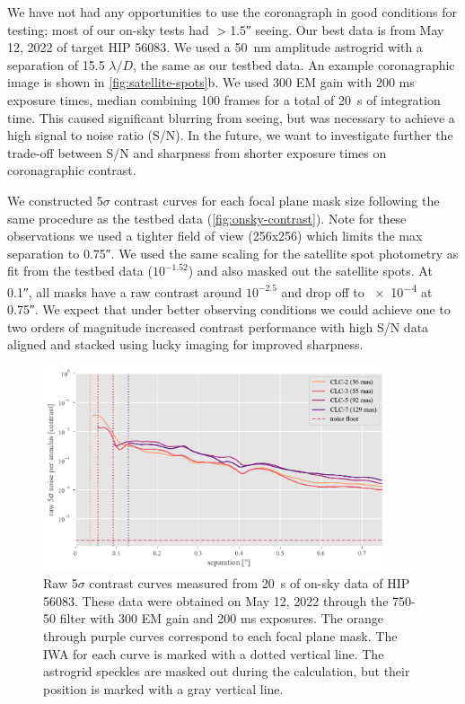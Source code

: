 \documentclass[]{spie}  %
\begin{document}
We have not had any opportunities to use the coronagraph in good conditions for testing; most of our on-sky tests had $>$\ang{;;1.5} seeing. Our best data is from May 12, 2022 of target HIP 56083. We used a \qty{50}{\nano\meter} amplitude astrogrid with a separation of 15.5 $\lambda/D$, the same as our testbed data. An example coronagraphic image is shown in \autoref{fig:satellite-spots}b. We used 300 EM gain with 200 ms exposure times, median combining 100 frames for a total of \qty{20}{\second} of integration time. This caused significant blurring from seeing, but was necessary to achieve a high signal to noise ratio (S/N). In the future, we want to investigate further the trade-off between S/N and sharpness from shorter exposure times on coronagraphic contrast.

We constructed 5$\sigma$ contrast curves for each focal plane mask size following the same procedure as the testbed data (\autoref{fig:onsky-contrast}). Note for these observations we used a tighter field of view (256x256) which limits the max separation to \ang{;;0.75}. We used the same scaling for the satellite spot photometry as fit from the testbed data ($10^{-1.52}$) and also masked out the satellite spots. At \ang{;;0.1}, all masks have a raw contrast around $10^{-2.5}$ and drop off to \num{e-4} at \ang{;;0.75}. We expect that under better observing conditions we could achieve one to two orders of magnitude increased contrast performance with high S/N data aligned and stacked using lucky imaging for improved sharpness.

\begin{figure}
   \centering
   \includegraphics[width=0.9\textwidth]{figures/HIP56083_20220512_curves}
   \caption{Raw 5$\sigma$ contrast curves measured from \qty{20}{\second} of on-sky data of HIP 56083. These data were obtained on May 12, 2022 through the 750-50 filter with 300 EM gain and 200 ms exposures. The orange through purple curves correspond to each focal plane mask. The IWA for each curve is marked with a dotted vertical line. The astrogrid speckles are masked out during the calculation, but their position is marked with a gray vertical line.}\label{fig:onsky-contrast}
\end{figure}
\end{document}
